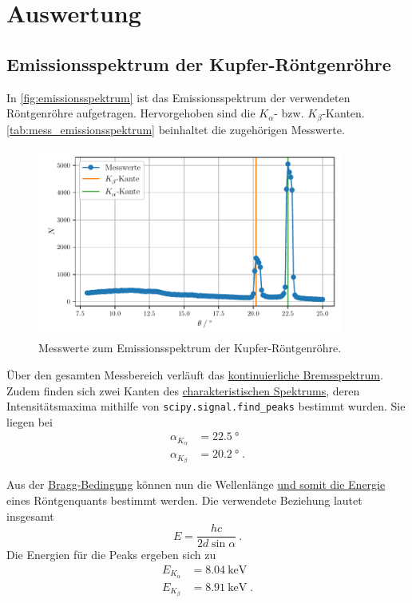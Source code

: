 \section{Auswertung}
\label{sec:auswertung}

\subsection{Emissionsspektrum der Kupfer-Röntgenröhre}
\label{sec:auswertung:emissionsspektrum}

In \autoref{fig:emissionsspektrum} ist das Emissionsspektrum der verwendeten Röntgenröhre aufgetragen.
Hervorgehoben sind die $K_\alpha$- bzw. $K_\beta$-Kanten.
\autoref{tab:mess_emissionsspektrum} beinhaltet die zugehörigen Messwerte.

\begin{figure}
    \centering
    \includegraphics[width=0.9\textwidth]{build/plt/emissionsspektrum.pdf}
    \caption{Messwerte zum Emissionsspektrum der Kupfer-Röntgenröhre.}
    \label{fig:emissionsspektrum}
\end{figure}

Über den gesamten Messbereich verläuft das \hyperref[sec:theorie:bremsspektrum]{kontinuierliche Bremsspektrum}.
Zudem finden sich zwei Kanten des \hyperref[sec:theorie:char_spektrum]{charakteristischen Spektrums},
deren Intensitätsmaxima mithilfe von \texttt{scipy.signal.find\_peaks} bestimmt wurden.
Sie liegen bei
\begin{align*}
    \alpha_{K_\alpha} &= \SI{22.5}{\degree} \\
    \alpha_{K_\beta}  &= \SI{20.2}{\degree} \; .
\end{align*}

Aus der \hyperref[eqn:BraggBedingung]{Bragg-Bedingung} können nun
die Wellenlänge \hyperref[eqn:lambda_to_E]{und somit die Energie} eines Röntgenquants bestimmt werden.
Die verwendete Beziehung lautet insgesamt
\[ E = \frac{h c}{2 d \sin{\alpha}} \ . \]
Die Energien für die Peaks ergeben sich zu
\begin{align*}
    E_{K_\alpha} &= \SI{8.04}{\kilo\electronvolt} \\
    E_{K_\beta}  &= \SI{8.91}{\kilo\electronvolt} \; .
\end{align*}

